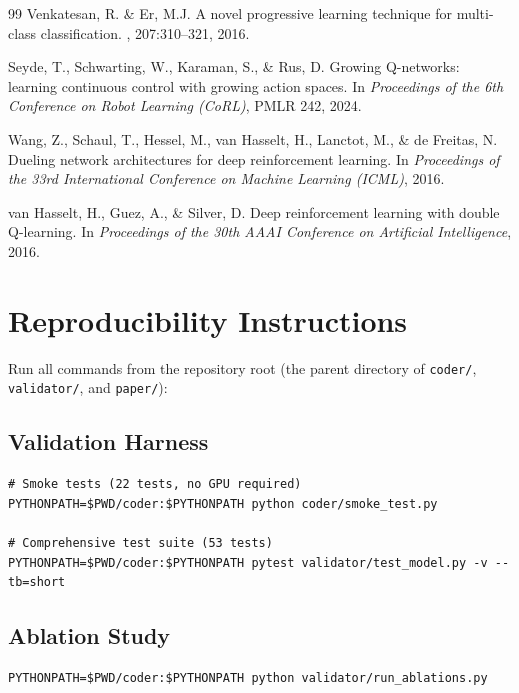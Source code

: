 \documentclass{article}
\begin{document}
{\begin{thebibliography}{99}
Venkatesan, R. \& Er, M.J.
\newblock A novel progressive learning technique for multi-class classification.
, 207:310--321, 2016.

Seyde, T., Schwarting, W., Karaman, S., \& Rus, D.
\newblock Growing Q-networks: learning continuous control with growing action spaces.
\newblock In {\it Proceedings of the 6th Conference on Robot Learning (CoRL)}, PMLR 242, 2024.

Wang, Z., Schaul, T., Hessel, M., van Hasselt, H., Lanctot, M., \& de Freitas, N.
\newblock Dueling network architectures for deep reinforcement learning.
\newblock In {\it Proceedings of the 33rd International Conference on Machine Learning (ICML)}, 2016.

van Hasselt, H., Guez, A., \& Silver, D.
\newblock Deep reinforcement learning with double Q-learning.
\newblock In {\it Proceedings of the 30th AAAI Conference on Artificial Intelligence}, 2016.

\end{thebibliography}
}


\appendix
\section{Reproducibility Instructions}

Run all commands from the repository root (the parent directory of \texttt{coder/}, \texttt{validator/}, and \texttt{paper/}):

\subsection{Validation Harness}
\begin{verbatim}
# Smoke tests (22 tests, no GPU required)
PYTHONPATH=$PWD/coder:$PYTHONPATH python coder/smoke_test.py

# Comprehensive test suite (53 tests)
PYTHONPATH=$PWD/coder:$PYTHONPATH pytest validator/test_model.py -v --tb=short
\end{verbatim}

\subsection{Ablation Study}
\begin{verbatim}
PYTHONPATH=$PWD/coder:$PYTHONPATH python validator/run_ablations.py
\end{verbatim}
\end{document}
